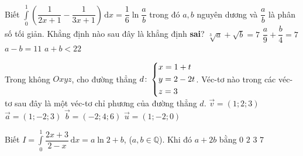 \begin{ex}%
	Biết $\displaystyle \int\limits_{0}^{1}\left(\dfrac{1}{2x+1}-\dfrac{1}{3x+1}\right)\mathrm{\,d}x=\dfrac{1}{6}\ln \dfrac{a}{b}$ trong đó $a, b$ nguyên dương và $\dfrac{a}{b}$ là phân số tối giản. Khẳng định nào sau đây là khẳng định {\bf sai}?
	\choice%
	{$\sqrt[3]{a}+\sqrt{b}=7$}
	{$\dfrac{a}{9}+\dfrac{b}{4}=7$}
	{$a-b=11$}
	{\True $a+b<22$}
\end{ex}


\begin{ex}%
	Trong không $Oxyz$, cho đường thẳng $d\colon \left\{\begin{aligned}&x=1+t\\&y=2-2t\\&z=3\end{aligned}\right.$. Véc-tơ nào trong các véc-tơ sau đây là một véc-tơ chỉ phương của đường thẳng $d$.
	\choice%
	{$\vec{v}=(1;2;3)$}
	{$\vec{a}=(1;-2;3)$}
	{$\vec{b}=(-2;4;6)$}
	{\True $\vec{u}=(1;-2;0)$}
\end{ex}

\begin{ex}%
	Biết $I=\displaystyle \int\limits_{0}^{1}\dfrac{2x+3}{2-x}\mathrm{\,d}x=a\ln2 + b$, ($a,b \in \mathbb{Q}$). Khi đó $a+2b$ bằng
	\choice%
	{$0$}
	{$2$}
	{\True $3$}
	{$7$}
\end{ex}


